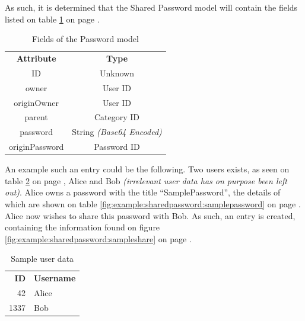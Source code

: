 			As such, it is determined that the Shared Password model will contain the fields listed on table \ref{fig:model:sharedpassword} on page \pageref{fig:model:sharedpassword}. 

			\begin{table}[p]
				\centering
				\begin{tabular}{c|c}
					\textbf{Attribute} 		& \textbf{Type} 		\\
					ID 						& Unknown 		\\
					owner 					& User ID \\
					originOwner 			& User ID \\
					parent 					& Category ID \\
					password 				& String \emph{(Base64 Encoded)} \\
					originPassword 			& Password ID 		\\
				\end{tabular}
				\caption{Fields of the Password model}
				\label{fig:model:sharedpassword}
			\end{table}

			An example such an entry could be the following. Two users exists, as seen on table \ref{fig:example:sharedpassword:users} on page \pageref{fig:example:sharedpassword:users}, Alice and Bob \emph{(irrelevant user data has on purpose been left out)}. Alice owns a password with the title ``SamplePassword'', the details of which are shown on table \ref{fig:example:sharedpassword:samplepassword} on page \pageref{fig:example:sharedpassword:samplepassword}. Alice now wishes to share this password with Bob. As such, an entry is created, containing the information found on figure \ref{fig:example:sharedpassword:sampleshare} on page \pageref{fig:example:sharedpassword:sampleshare}.
			\begin{table}[p]
				\centering
				\begin{tabular}{r|l}
					\textbf{ID} 		& \textbf{Username} \\
					42 					& Alice 			\\
					1337  				& Bob 				\\
				\end{tabular}
				\caption{Sample user data}
				\label{fig:example:sharedpassword:users}
			\end{table}

